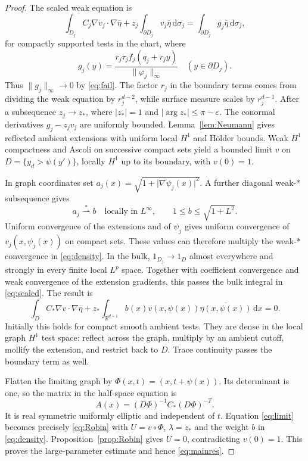 \documentclass[11pt]{article}
\newcommand{\R}{\mathbb R}
\newcommand{\dd}{\,\mathrm d}
\newcommand{\norm}[1]{\lVert #1\rVert}
\newcommand{\abs}[1]{\lvert #1\rvert}
\begin{document}
\begin{proof}
The scaled weak equation is
\begin{equation}\label{eq:scaled}
 \int_{D_j} C_j\nabla v_j\cdot\nabla\overline\eta
   +z_j\int_{\partial D_j}v_j\overline\eta\dd\sigma_j
     =\int_{\partial D_j}g_j\overline\eta\dd\sigma_j,
\end{equation}
for compactly supported tests in the chart, where
\[
 g_j(y)=\frac{r_j\tau_j f_j(q_j+r_jy)}{\norm{\varphi_j}_\infty}
 \quad (y\in\partial D_j).
\]
Thus $\norm{g_j}_\infty\to0$ by \eqref{eq:fail}. The factor $r_j$ in the
boundary terms comes from dividing the weak equation by $r_j^{d-2}$,
while surface measure scales by $r_j^{d-1}$.
After a subsequence $z_j\to z_*$, where $\abs{z_*}=1$ and
$\abs{\arg z_*}\leq\pi-\varepsilon$.
The conormal derivatives $g_j-z_jv_j$ are uniformly bounded.
Lemma~\ref{lem:Neumann} gives reflected ambient extensions with uniform
local $H^1$ and H\"older bounds. Weak $H^1$ compactness and Ascoli on
successive compact sets yield a bounded limit $v$ on
$D=\{y_d>\psi(y')\}$, locally $H^1$ up to its boundary, with $v(0)=1$.

In graph coordinates set
$a_j(x)=\sqrt{1+\abs{\nabla\psi_j(x)}^2}$.
A further diagonal weak-$*$ subsequence gives
\begin{equation}\label{eq:density}
 a_j\mathrel{\overset{*}{\rightharpoonup}} b\quad\text{locally in }L^\infty,
 \qquad 1\leq b\leq\sqrt{1+L^2}.
\end{equation}
Uniform convergence of the extensions and of $\psi_j$ gives uniform
convergence of $v_j(x,\psi_j(x))$ on compact sets. These values can therefore
multiply the weak-$*$ convergence in \eqref{eq:density}.
In the bulk, $1_{D_j}\to1_D$ almost everywhere and strongly in every finite
local $L^p$ space. Together with coefficient convergence and weak convergence
of the extension gradients, this passes the bulk integral in
\eqref{eq:scaled}. The result is
\begin{equation}\label{eq:limit}
 \int_D C_*\nabla v\cdot\nabla\overline\eta
   +z_*\int_{\R^{d-1}}b(x)v(x,\psi(x))
                            \overline{\eta(x,\psi(x))}\dd x=0.
\end{equation}
Initially this holds for compact smooth ambient tests. They are dense in
the local graph $H^1$ test space: reflect across the graph, multiply by an
ambient cutoff, mollify the extension, and restrict back to $D$.
Trace continuity passes the boundary term as well.

Flatten the limiting graph by $\Phi(x,t)=(x,t+\psi(x))$. Its determinant is
one, so the matrix in the half-space equation is
\[
 A(x)=(D\Phi)^{-1}C_*(D\Phi)^{-T}.
\]
It is real symmetric uniformly elliptic and independent of $t$.
Equation \eqref{eq:limit} becomes precisely \eqref{eq:Robin} with
$U=v\circ\Phi$, $\lambda=z_*$ and the weight $b$ in \eqref{eq:density}.
Proposition~\ref{prop:Robin} gives $U=0$, contradicting $v(0)=1$.
This proves the large-parameter estimate and hence \eqref{eq:mainres}.
\end{proof}
\end{document}
